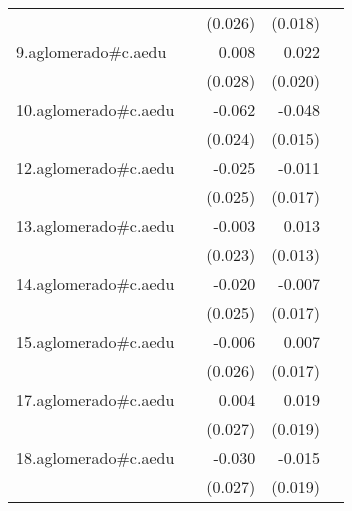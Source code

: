 {\begin{longtable}{l*{4}{D{.}{.}{-1}}}
            &                     &     (0.026)         &     (0.018)         &                     \\
\addlinespace
9.aglomerado#c.aedu&                     &       0.008         &       0.022         &                     \\
            &                     &     (0.028)         &     (0.020)         &                     \\
\addlinespace
10.aglomerado#c.aedu&                     &      -0.062\sym{**} &      -0.048\sym{**} &                     \\
            &                     &     (0.024)         &     (0.015)         &                     \\
\addlinespace
12.aglomerado#c.aedu&                     &      -0.025         &      -0.011         &                     \\
            &                     &     (0.025)         &     (0.017)         &                     \\
\addlinespace
13.aglomerado#c.aedu&                     &      -0.003         &       0.013         &                     \\
            &                     &     (0.023)         &     (0.013)         &                     \\
\addlinespace
14.aglomerado#c.aedu&                     &      -0.020         &      -0.007         &                     \\
            &                     &     (0.025)         &     (0.017)         &                     \\
\addlinespace
15.aglomerado#c.aedu&                     &      -0.006         &       0.007         &                     \\
            &                     &     (0.026)         &     (0.017)         &                     \\
\addlinespace
17.aglomerado#c.aedu&                     &       0.004         &       0.019         &                     \\
            &                     &     (0.027)         &     (0.019)         &                     \\
\addlinespace
18.aglomerado#c.aedu&                     &      -0.030         &      -0.015         &                     \\
            &                     &     (0.027)         &     (0.019)         &                     \\

\end{longtable}}
